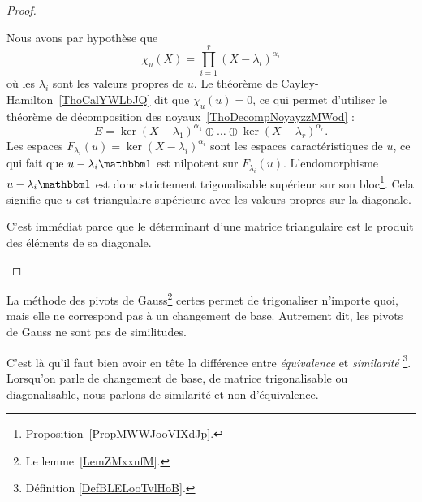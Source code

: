 \begin{proof}
    \begin{subproof}
        \item[\ref{ItemZKDMooOrTHkwii}\( \Rightarrow\)\ref{ItemZKDMooOrTHkwi}]
            Nous avons par hypothèse que
            \begin{equation}
                \chi_u(X)=\prod_{i=1}^r(X-\lambda_i)^{\alpha_i}
            \end{equation}
            où les \( \lambda_i\) sont les valeurs propres de \( u\). Le théorème de Cayley-Hamilton~\ref{ThoCalYWLbJQ} dit que \( \chi_u(u)=0\), ce qui permet d'utiliser le théorème de décomposition des noyaux~\ref{ThoDecompNoyayzzMWod} :
            \begin{equation}
                E=\ker(X-\lambda_1)^{\alpha_1}\oplus\ldots\oplus\ker(X-\lambda_r)^{\alpha_r}.
            \end{equation}
            Les espaces \( F_{\lambda_i}(u)=\ker(X-\lambda_i)^{\alpha_i}\) sont les espaces caractéristiques de \( u\), ce qui fait que \( u-\lambda_i\mtu\) est nilpotent sur \( F_{\lambda_i}(u)\). L'endomorphisme \( u-\lambda_i\mtu\) est donc strictement trigonalisable supérieur sur son bloc\footnote{Proposition~\ref{PropMWWJooVIXdJp}.}. Cela signifie que \( u\) est triangulaire supérieure avec les valeurs propres sur la diagonale.

        \item[\ref{ItemZKDMooOrTHkwi}\( \Rightarrow\)\ref{ItemZKDMooOrTHkwii}]

            C'est immédiat parce que le déterminant d'une matrice triangulaire est le produit des éléments de sa diagonale.
    \end{subproof}
\end{proof}

\begin{remark}
    La méthode des pivots de Gauss\footnote{Le lemme~\ref{LemZMxxnfM}.} certes permet de trigonaliser n'importe quoi, mais elle ne correspond pas à un changement de base. Autrement dit, les pivots de Gauss ne sont pas de similitudes.

    C'est là qu'il faut bien avoir en tête la différence entre \emph{équivalence} et \emph{similarité} \footnote{Définition \ref{DefBLELooTvlHoB}.}. Lorsqu'on parle de changement de base, de matrice trigonalisable ou diagonalisable, nous parlons de similarité et non d'équivalence.
\end{remark}

